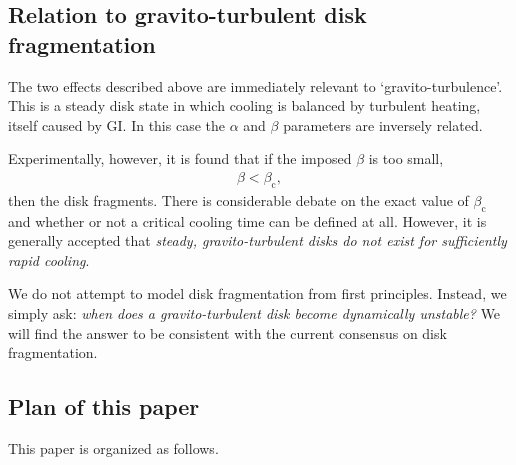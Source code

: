\documentclass[iop, numberedappendix]{emulateapj}
\begin{document}
\subsection{Relation to gravito-turbulent disk fragmentation}
The two effects described above are immediately relevant to
`gravito-turbulence'. This is a steady disk state in which cooling is
balanced by turbulent heating, itself caused by GI. In this case 
the $\alpha$ and $\beta$ parameters are inversely related.   

Experimentally, however, it is found that if the imposed $\beta$ is
too small, 
\begin{align}
  \beta < \beta_\mathrm{c},
\end{align}
then the disk fragments. There is considerable debate on the exact
value of $\beta_\mathrm{c}$ and whether or not a critical cooling time can
be defined at all. However, it is generally accepted that \emph{
  steady, gravito-turbulent disks do not exist for sufficiently rapid
cooling}. 

We do not attempt to model disk fragmentation from first
principles. Instead, we simply ask: \emph{when does a 
  gravito-turbulent disk become dynamically unstable?} 
We will find the answer to be consistent with the current consensus on
disk fragmentation. 


\subsection{Plan of this paper}

This paper is organized as follows. 








 


\appendix




\end{document}
